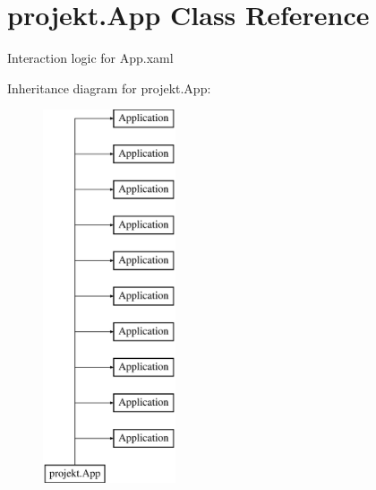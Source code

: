 \hypertarget{classprojekt_1_1_app}{}\section{projekt.\+App Class Reference}
\label{classprojekt_1_1_app}


Interaction logic for App.\+xaml  


Inheritance diagram for projekt.\+App\+:\begin{figure}[H]
\begin{center}
\leavevmode
\includegraphics[height=11.000000cm]{classprojekt_1_1_app}
\end{center}
\end{figure}

